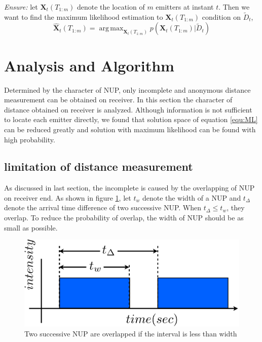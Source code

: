 \documentclass[conference]{IEEEtran}
\DeclareMathOperator*{\argmax}{arg\,max}
\begin{document}
\emph{Ensure:} let $\mathbf{X}_t(T_{1:m})$ denote the location of $m$ emitters
at instant $t$. Then we want to find the maximum likelihood estimation to
$\mathbf{X}_t(T_{1:m})$ condition on $\tilde{D}_t$, 
\begin{equation}
    \hat{\mathbf{X}}_t(T_{1:m})=\argmax_{\mathbf{X}_t(T_{1:m})} p(\mathbf{X}_t(T_{1:m})|\tilde{D}_t)
    \label{equ:ML}
\end{equation}

\section{Analysis and Algorithm}
Determined by the character of NUP, only incomplete and anonymous distance measurement
can be obtained on receiver. In this section the character of distance obtained on
receiver is analyzed. Although information is not sufficient to locate each emitter
directly, we found that solution space of equation \ref{equ:ML} can be reduced greatly and
solution with maximum likelihood can be found with high probability. 

\subsection{limitation of distance measurement}
As discussed in last section, the incomplete is caused by the overlapping of NUP on
receiver end. As shown in figure \ref{fig:overlap}, let $t_w$ denote the width of a NUP
and  $t_\Delta$ denote the arrival time difference of two successive NUP. When
$t_\Delta\le t_w$, they overlap. To reduce the probability of overlap, the width of NUP
should be as small as possible.
\begin{figure}[htpb]
    \begin{center}
	\includegraphics[width=.25\textwidth]{overlap}
    \end{center}
    \caption{Two successive NUP are overlapped if the interval is less than width }
    \label{fig:overlap}
\end{figure}
 
\end{document}

